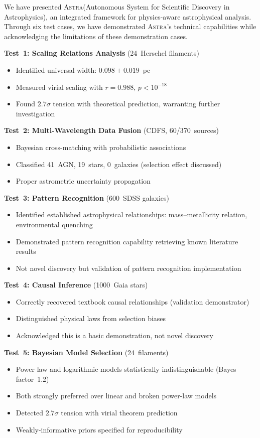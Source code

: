 \documentclass[fleqn,usenatbib]{mnras}
\newcommand{\astra}{\textsc{Astra}\xspace}
\begin{document}
We have presented \astra (Autonomous System for Scientific Discovery in Astrophysics), an integrated framework for physics-aware astrophysical analysis.
Through six test cases, we have demonstrated \astra's technical capabilities while acknowledging the limitations of these demonstration cases.

\textbf{Test~1: Scaling Relations Analysis} (24~Herschel filaments)
\begin{itemize}
  \item Identified universal width: $0.098 \pm 0.019$~pc
  \item Measured virial scaling with $r = 0.988$, $p < 10^{-18}$
  \item Found $2.7\sigma$ tension with theoretical prediction, warranting further investigation
\end{itemize}

\textbf{Test~2: Multi-Wavelength Data Fusion} (CDFS, 60/370~sources)
\begin{itemize}
  \item Bayesian cross-matching with probabilistic associations
  \item Classified 41~AGN, 19~stars, 0~galaxies (selection effect discussed)
  \item Proper astrometric uncertainty propagation
\end{itemize}

\textbf{Test~3: Pattern Recognition} (600~SDSS galaxies)
\begin{itemize}
  \item Identified established astrophysical relationships: mass--metallicity relation, environmental quenching
  \item Demonstrated pattern recognition capability retrieving known literature results
  \item Not novel discovery but validation of pattern recognition implementation
\end{itemize}

\textbf{Test~4: Causal Inference} (1000~Gaia stars)
\begin{itemize}
  \item Correctly recovered textbook causal relationships (validation demonstrator)
  \item Distinguished physical laws from selection biases
  \item Acknowledged this is a basic demonstration, not novel discovery
\end{itemize}

\textbf{Test~5: Bayesian Model Selection} (24~filaments)
\begin{itemize}
  \item Power law and logarithmic models statistically indistinguishable (Bayes factor~1.2)
  \item Both strongly preferred over linear and broken power-law models
  \item Detected $2.7\sigma$ tension with virial theorem prediction
  \item Weakly-informative priors specified for reproducibility
\end{itemize}
\end{document}
